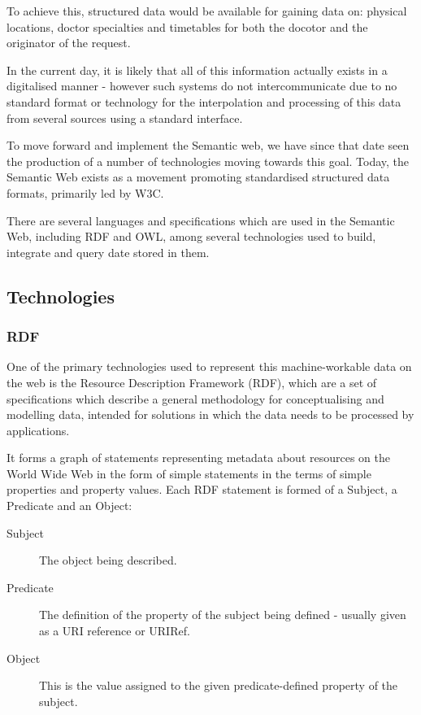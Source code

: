 \documentclass{article}
\begin{document}
To achieve this, structured data would be available for gaining data on:
physical locations, doctor specialties and timetables for both the docotor and
the originator of the request. 

In the current day, it is likely that all of this information actually exists in
a digitalised manner - however such systems do not intercommunicate due to no
standard format or technology for the interpolation and processing of this data
from several sources using a standard interface.

To move forward and implement the Semantic web, we have since that date seen the
production of a number of technologies moving towards this goal. Today, the
Semantic Web exists as a movement promoting standardised structured data
formats, primarily led by W3C.

There are several languages and specifications which are used in the Semantic
Web, including RDF and OWL, among several technologies used to build, integrate
and query date stored in them.

\subsection{Technologies}

\subsubsection{RDF}

One of the primary technologies used to represent this machine-workable data on
the web is the Resource Description Framework (RDF), which are a set of
specifications which describe a general methodology for conceptualising and
modelling data, intended for solutions in which the data needs to be processed
by applications.

It forms a graph of statements representing metadata about resources on the
World Wide Web in the form of simple statements in the terms of simple
properties and property values. Each RDF statement is formed of a Subject, a
Predicate and an Object:

\begin{description}
    \item[Subject] The object being described.
    \item[Predicate] The definition of the property of the subject being
    defined - usually given as a URI reference or URIRef.
    \item[Object] This is the value assigned to the given
    predicate-defined property of the subject.
\end{description}
\end{document}
